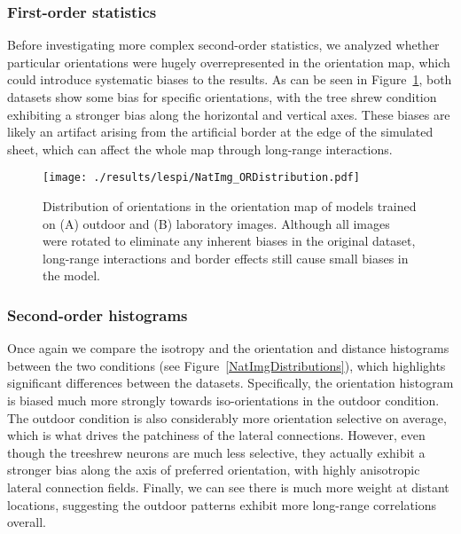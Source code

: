 \subsubsection*{First-order statistics}

Before investigating more complex second-order statistics, we analyzed
whether particular orientations were hugely overrepresented in the
orientation map, which could introduce systematic biases to the
results. As can be seen in Figure~\ref{NatImgORs}, both datasets show
some bias for specific orientations, with the tree shrew condition
exhibiting a stronger bias along the horizontal and vertical
axes. These biases are likely an artifact arising from the artificial
border at the edge of the simulated sheet, which can affect the whole
map through long-range interactions.

\begin{figure}
	\centering
    \texttt{[image: ./results/lespi/NatImg\_ORDistribution.pdf]}
	\caption[Distribution of orientations in the orientation map of
      models trained on outdoor and laboratory images.]{Distribution
      of orientations in the orientation map of models trained on (A)
      outdoor and (B) laboratory images. Although all images were
      rotated to eliminate any inherent biases in the original
      dataset, long-range interactions and border effects still cause
      small biases in the model.}
	\label{NatImgORs}
\end{figure}

\subsubsection*{Second-order histograms}

Once again we compare the isotropy and the orientation and distance
histograms between the two conditions (see
Figure~\ref{NatImgDistributions}), which highlights significant
differences between the datasets. Specifically, the orientation
histogram is biased much more strongly towards iso-orientations in the
outdoor condition. The outdoor condition is also considerably more
orientation selective on average, which is what drives the patchiness
of the lateral connections. However, even though the treeshrew neurons
are much less selective, they actually exhibit a stronger bias along
the axis of preferred orientation, with highly anisotropic lateral
connection fields. Finally, we can see there is much more weight at
distant locations, suggesting the outdoor patterns exhibit more
long-range correlations overall.

